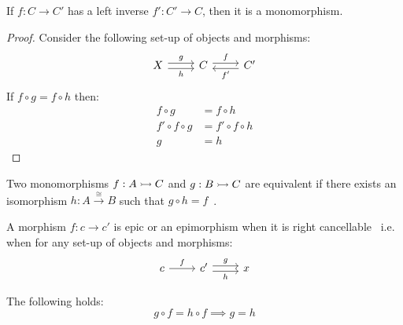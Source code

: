 \begin{theorem}\label{thm:left_inverse_implies_mono}

  If $f:C\to C'$ has a left inverse $f':C'\to C$, then it is a monomorphism.

  \begin{proof}
    Consider the following set-up of objects and morphisms:
    \[
      \begin{tikzcd}[ampersand replacement=\&]
        X \& C \& {C'}
        \arrow["f", shift left=1, from=1-2, to=1-3]
        \arrow["g", shift left=1, from=1-1, to=1-2]
        \arrow["h"', shift right=1, from=1-1, to=1-2]
        \arrow["{f'}", shift left=1, from=1-3, to=1-2]
      \end{tikzcd}
    \]
    If $f\circ g = f\circ h$ then:
    \[
      \begin{aligned}
        f\circ g &= f\circ h\\
        f'\circ f \circ g &= f'\circ f\circ h\\
        g &= h
      \end{aligned}
    \]
  \end{proof}
  \vspace{-\baselineskip}
\end{theorem}

\begin{definition}
  Two monomorphisms $f:A\rightarrowtail C$ and $g:B\rightarrowtail C$ are equivalent if there exists
  an isomorphism $h: A \overset{\cong}{\to} B$ such
  that $g\circ h=f$~\parencite[p.~11]{lane_moerdijk:sheaves_geometry_logic}.
\end{definition}

\begin{definition}
  A morphism $f:c\to c'$ is epic or an epimorphism when it is right
  cancellable~\parencite[p.~19]{lane:working_mathematician} i.e. when for any set-up of
  objects and morphisms:
  \[\begin{tikzcd}[ampersand replacement=\&]
    c \& {c'} \& x
    \arrow["h"', shift right=1, from=1-2, to=1-3]
    \arrow["f", from=1-1, to=1-2]
    \arrow["g", shift left=1, from=1-2, to=1-3]
  \end{tikzcd}\]

  The following holds:
  \[g \circ f = h \circ f \implies g = h\]
\end{definition}

